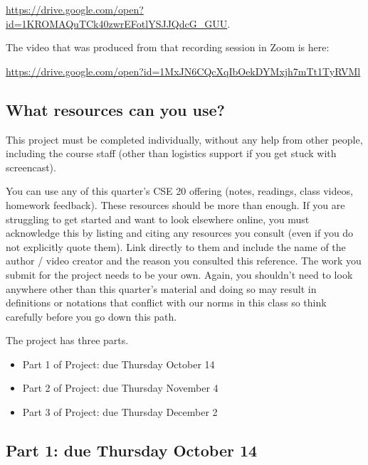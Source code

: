 \documentclass[12pt, oneside]{article}
\begin{document}
\url{https://drive.google.com/open?id=1KROMAQuTCk40zwrEFotlYSJJQdcG_GUU}.

The video that was produced from that recording session in Zoom is here:

\url{https://drive.google.com/open?id=1MxJN6CQcXqIbOekDYMxjh7mTt1TyRVMl}

\subsection*{What resources can you use?}
This project must be completed individually, without any help from other people, 
including the course staff (other than logistics support if you get stuck with screencast). 

You can use any of this quarter's CSE 20 offering (notes, readings, class videos, homework feedback). 
These resources should be more than enough. If you are struggling to get started and want to 
look elsewhere online, you must acknowledge this by listing and citing any resources you consult 
(even if you do not explicitly quote them). Link directly to them and include the name of the 
author / video creator and the reason you consulted this reference. The work you submit for 
the project needs to be your own. Again, you shouldn't need to look anywhere other 
than this quarter's material and doing so may result in definitions or notations 
that conflict with our norms in this class so think carefully before you go down this path.

The project has three parts. 
\begin{itemize}
    \item Part 1 of Project: due Thursday October 14
    \item Part 2 of Project: due Thursday November 4
    \item Part 3 of Project: due Thursday December 2
\end{itemize}

\newpage
\subsection*{Part 1: due Thursday October 14}
\end{document}
